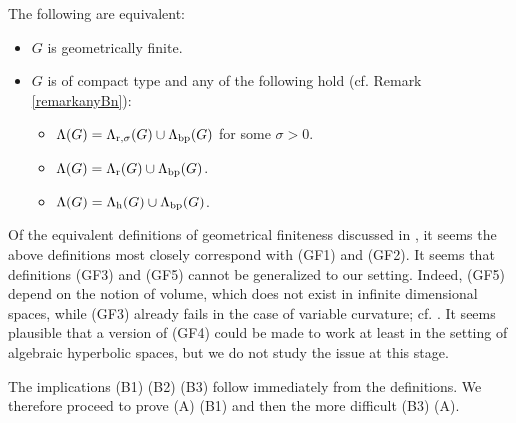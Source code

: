 \begin{theorem}
\label{theoremGFcompact}
The following are equivalent:
\begin{itemize}
\item[(A)] $G$ is geometrically finite.
\item[(B)] $G$ is of compact type and any of the following hold (cf. Remark \ref{remarkanyBn}):
\begin{itemize}
\item[(B1)] $\Lambda(G) = \Lambda_{\mathrm r,\sigma}(G) \cup \Lambda_{\mathrm{bp}}(G)$ for some $\sigma > 0$.
\item[(B2)] $\Lambda(G) = \Lambda_{\mathrm r}(G) \cup \Lambda_{\mathrm{bp}}(G)$.
\item[(B3)] $\Lambda(G) = \Lambda_{\mathrm h}(G) \cup \Lambda_{\mathrm{bp}}(G)$.
\end{itemize}
\end{itemize}
\end{theorem}
\begin{remark}
\label{remarkbowditchcomparision}
Of the equivalent definitions of geometrical finiteness discussed in \cite{Bowditch_geometrical_finiteness}, it seems the above definitions most closely correspond with (GF1) and (GF2). It seems that definitions (GF3) and (GF5) cannot be generalized to our setting. Indeed, (GF5) depend on the notion of volume, which does not exist in infinite dimensional spaces, while (GF3) already fails in the case of variable curvature; cf. \cite{Bowditch_geometrical_finiteness2}. It seems plausible that a version of (GF4) could be made to work at least in the setting of algebraic hyperbolic spaces, but we do not study the issue at this stage.
\end{remark}

The implications (B1) \implies (B2) \implies (B3) follow immediately from the definitions. We therefore proceed to prove (A) \implies (B1) and then the more difficult (B3) \implies (A).

